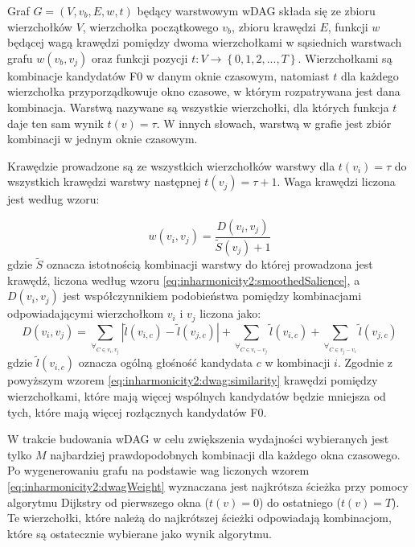\documentclass[12pt,a4paper,twoside]{mwart}
\begin{document}
Graf $G = \left(V, v_b, E, w, t\right)$ będący warstwowym wDAG składa się ze zbioru wierzchołków $V$, wierzchołka początkowego $v_b$, zbioru krawędzi $E$, funkcji $w$ będącej wagą krawędzi pomiędzy dwoma wierzchołkami w sąsiednich warstwach grafu $w(v_b, v_j)$ oraz funkcji pozycji $t: V \rightarrow \left\{0, 1, 2, ..., T\right\}$. Wierzchołkami są kombinacje kandydatów F0 w danym oknie czasowym, natomiast $t$ dla każdego wierzchołka przyporządkowuje okno czasowe, w którym rozpatrywana jest dana kombinacja. Warstwą nazywane są wszystkie wierzchołki, dla których funkcja $t$ daje ten sam wynik $t(v) = \tau$. W innych słowach, warstwą w grafie jest zbiór kombinacji w jednym oknie czasowym.

Krawędzie prowadzone są ze wszystkich wierzchołków warstwy dla $t(v_i) = \tau$ do wszystkich krawędzi warstwy następnej $t(v_j) = \tau + 1$. Waga krawędzi liczona jest według wzoru:

\begin{equation}\label{eq:inharmonicity2:dwagWeight}
w(v_i, v_j) = \frac{D(v_i, v_j)}{\widetilde{S}(v_j) + 1}
\end{equation}
gdzie $\widetilde{S}$ oznacza istotnością kombinacji warstwy do której prowadzona jest krawędź, liczona według wzoru \ref{eq:inharmonicity2:smoothedSalience}, a $D(v_i, v_j)$ jest współczynnikiem podobieństwa pomiędzy kombinacjami odpowiadającymi wierzchołkom $v_i$ i $v_j$ liczona jako:
\begin{equation}\label{eq:inharmonicity2:dwag:similarity}
D(v_i, v_j) = \sum_{\forall_{C\in v_i, v_j}}\left|\widetilde{l}(v_{i,c}) - \widetilde{l}(v_{j,c}) \right| + \sum_{\forall_{C\in v_i - v_j}}\widetilde{l}(v_{i,c}) + \sum_{\forall_{C\in v_j - v_i}}\widetilde{l}(v_{j,c})
\end{equation}
gdzie $\widetilde{l}(v_{i,c})$ oznacza ogólną głośność kandydata $c$ w kombinacji $i$. Zgodnie z powyższym wzorem \ref{eq:inharmonicity2:dwag:similarity} krawędzi pomiędzy wierzchołkami, które mają więcej wspólnych kandydatów będzie mniejsza od tych, które mają więcej rozłącznych kandydatów F0.

W trakcie budowania wDAG w celu zwiększenia wydajności wybieranych jest tylko $M$ najbardziej prawdopodobnych kombinacji dla każdego okna czasowego. Po wygenerowaniu grafu na podstawie wag liczonych wzorem \ref{eq:inharmonicity2:dwagWeight} wyznaczana jest najkrótsza ścieżka przy pomocy algorytmu Dijkstry \cite[269–271]{Transcription:Dijkstra:Graphs} od pierwszego okna ($t(v) = 0$) do ostatniego ($t(v) = T$). Te wierzchołki, które należą do najkrótszej ścieżki odpowiadają kombinacjom, które są ostatecznie wybierane jako wynik algorytmu.
\end{document}
